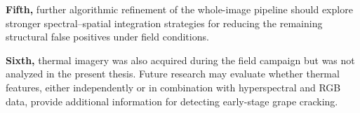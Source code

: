 \medskip
\noindent
\textbf{Fifth,} further algorithmic refinement of the whole-image pipeline should explore stronger spectral--spatial integration strategies for reducing the remaining structural false positives under field conditions.

\medskip
\noindent
\textbf{Sixth,} thermal imagery was also acquired during the field campaign but was not analyzed in the present thesis. Future research may evaluate whether thermal features, either independently or in combination with hyperspectral and RGB data, provide additional information for detecting early-stage grape cracking.




